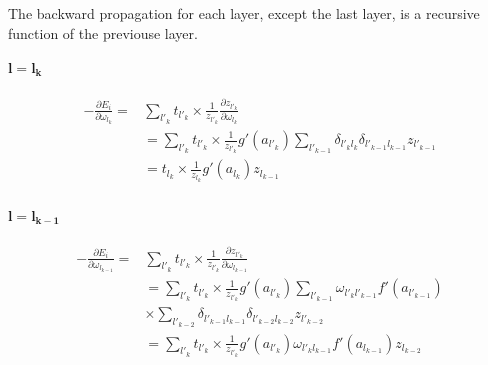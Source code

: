 \documentclass[final, paper=letter,5p,times,twocolumn]{elsarticle}
\begin{document}
The backward propagation for each layer, except the last layer, is a recursive function of the previouse layer.

\paragraph{$\bm{l = l_{k}}$}{

  \begin{equation*}
    \begin{split}
      - \frac{\partial E_{i}}{\partial \omega_{l_{k}}} = & \sum_{l'_{k}} t_{l'_{k}} \times \frac{1}{z_{l'_{k}}} \frac{\partial z_{l'_{k}}}{\partial \omega_{l_{k}}}\\
      & = \sum_{l'_{k}} t_{l'_{k}} \times \frac{1}{z_{l'_{k}}} g'(a_{l'_{k}})  \sum_{l'_{k-1}} \delta_{l'_{k}l_{k}} \delta_{l'_{k-1}l_{k-1}} z_{l'_{k-1}}  \\
      & = t_{l_{k}} \times \frac{1}{z_{l_{k}}} g'(a_{l_{k}})  z_{l_{k-1}}  \\
    \end{split}
\end{equation*}

}

\paragraph{$\bm{l = l_{k-1}}$}{

  \begin{equation*}
    \begin{split}
      - \frac{\partial E_{i}}{\partial \omega_{l_{k-1}}} = & \sum_{l'_{k}} t_{l'_{k}} \times \frac{1}{z_{l'_{k}}} \frac{\partial z_{l'_{k}}}{\partial \omega_{l_{k-1}}}\\
      & = \sum_{l'_{k}} t_{l'_{k}} \times \frac{1}{z_{l'_{k}}} g'(a_{l'_{k}})  \sum_{l'_{k-1}} \omega_{l'_{k}l'_{k-1}} f'(a_{l'_{k-1}}) \\
      & \times \sum_{l'_{k-2}} \delta_{l'_{k-1}l_{k-1}} \delta_{l'_{k-2}l_{k-2}} z_{l'_{k-2}}  \\
      & = \sum_{l'_{k}} t_{l'_{k}} \times \frac{1}{z_{l'_{k}}} g'(a_{l'_{k}}) \omega_{l'_{k}l_{k-1}} f'(a_{l_{k-1}}) z_{l_{k-2}}  \\
    \end{split}
\end{equation*}

}
\end{document}

